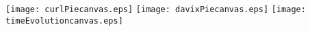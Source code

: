 \texttt{[image: curlPiecanvas.eps]}
\texttt{[image: davixPiecanvas.eps]}
\texttt{[image: timeEvolutioncanvas.eps]}
